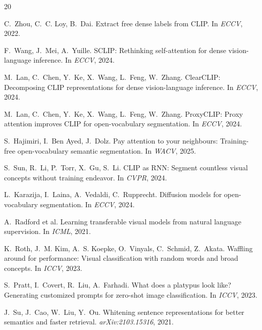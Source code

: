 \documentclass[11pt]{article}
\begin{document}

\begin{thebibliography}{20}

C.~Zhou, C.~C. Loy, B.~Dai.
\newblock Extract free dense labels from CLIP.
\newblock In \emph{ECCV}, 2022.

F.~Wang, J.~Mei, A.~Yuille.
\newblock SCLIP: Rethinking self-attention for dense vision-language inference.
\newblock In \emph{ECCV}, 2024.

M.~Lan, C.~Chen, Y.~Ke, X.~Wang, L.~Feng, W.~Zhang.
\newblock ClearCLIP: Decomposing CLIP representations for dense vision-language inference.
\newblock In \emph{ECCV}, 2024.

M.~Lan, C.~Chen, Y.~Ke, X.~Wang, L.~Feng, W.~Zhang.
\newblock ProxyCLIP: Proxy attention improves CLIP for open-vocabulary segmentation.
\newblock In \emph{ECCV}, 2024.

S.~Hajimiri, I.~Ben Ayed, J.~Dolz.
\newblock Pay attention to your neighbours: Training-free open-vocabulary semantic segmentation.
\newblock In \emph{WACV}, 2025.

S.~Sun, R.~Li, P.~Torr, X.~Gu, S.~Li.
\newblock CLIP as RNN: Segment countless visual concepts without training endeavor.
\newblock In \emph{CVPR}, 2024.

L.~Karazija, I.~Laina, A.~Vedaldi, C.~Rupprecht.
\newblock Diffusion models for open-vocabulary segmentation.
\newblock In \emph{ECCV}, 2024.

A.~Radford et al.
\newblock Learning transferable visual models from natural language supervision.
\newblock In \emph{ICML}, 2021.

K.~Roth, J.~M. Kim, A.~S. Koepke, O.~Vinyals, C.~Schmid, Z.~Akata.
\newblock Waffling around for performance: Visual classification with random words and broad concepts.
\newblock In \emph{ICCV}, 2023.

S.~Pratt, I.~Covert, R.~Liu, A.~Farhadi.
\newblock What does a platypus look like? Generating customized prompts for zero-shot image classification.
\newblock In \emph{ICCV}, 2023.

J.~Su, J.~Cao, W.~Liu, Y.~Ou.
\newblock Whitening sentence representations for better semantics and faster retrieval.
\newblock \emph{arXiv:2103.15316}, 2021.


\end{thebibliography}
\end{document}

